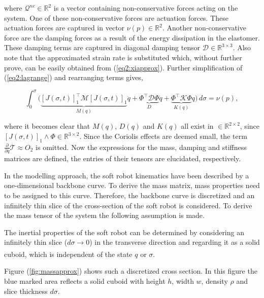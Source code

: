 {where $\mathcal{Q}^{nc} \in \mathbb{R}^2$ is a vector containing non-conservative forces acting on the system. One of these non-conservative forces are actuation forces. These actuation forces are captured in vector $\nu(p) \in \mathbb{R}^2$. Another non-conservative force are the damping forces as a result of the energy dissipation in the elastomer. These damping terms are captured in diagonal damping tensor $\mathcal{D} \in \mathbb{R}^{3 \times 3}$. Also note that the approximated strain rate is substituted which, without further prove, can be easily obtained from (\ref{eq2:xiapprox}). Further simplification of (\ref{eq2:lagrange}) and rearranging terms gives,

\begin{equation}
    \int_0^\sigma \Big( \underbrace{[J(\sigma,t)]_1^\top \mathcal{M} [J(\sigma,t)]_1}_{M(q)} \ddot{q} +  \underbrace{\Phi^\top \mathcal{D} \Phi }_{D} \dot{q}    +   \underbrace{\Phi^\top \mathcal{K} \Phi}_{K(q)} q\Big) \hspace{2pt} d\sigma = \nu(p),
\end{equation}

where it becomes clear that $M(q)$, $D(q)$ and $K(q)$ all exist in $\in \mathbb{R}^{2\times2}$, since $[J(\sigma,t)]_1 \land \Phi \in \mathbb{R}^{3 \times 2}$. Since the Coriolis effects are deemed small, the term $\frac{\partial}{\partial q}\mathcal{T} \approx O_2 $ is omitted. Now the expressions for the mass, damping and stiffness matrices are defined, the entries of their tensors are elucidated, respectively.

In the modelling approach, the soft robot kinematics have been described by a one-dimensional backbone curve. To derive the mass matrix, mass properties need to be assigned to this curve. Therefore, the backbone curve is discretized and an infinitely thin slice of the cross-section of the soft robot is considered. To derive the mass tensor of the system the following assumption is made.

\begin{theorem}
The inertial properties of the soft robot can be determined by considering an infinitely thin slice ($d \sigma \xrightarrow[]{}0$) in the transverse direction and regarding it as a solid cuboid, which is independent of the state $q$ or $\sigma$.
\end{theorem}

Figure (\ref{fig:massapprox}) shows such a discretized cross section. In this figure the blue marked area reflects a solid cuboid with height $h$, width $w$, density $\rho$ and slice thickness $d\sigma$. 


}
